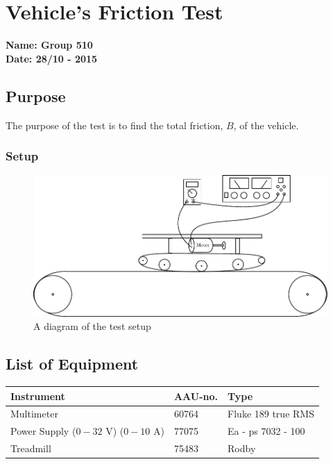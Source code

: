 \pagebreak
\section{Vehicle's Friction Test} \label{app:frictionTest}
\textbf{Name: Group 510}\\
\textbf{Date: 28/10 - 2015}

\subsection{Purpose}
The purpose of the test is to find the total friction, $B$, of the vehicle.
\subsubsection{Setup}
\begin{figure}[H]
  \centering
	\includegraphics[scale=1]{figures/frictionTestSetup.pdf}
	\caption{A diagram of the test setup}
\end{figure}

\subsection{List of Equipment}

\begin{table}[H]
\begin{tabular}{|l|l|p{4cm}|}
\hline%
  \textbf{Instrument}                       &  \textbf{AAU-no.}  &  \textbf{Type}         \\
\hline%
  Multimeter                                &  60764             &  Fluke 189 true RMS    \\
\hline%
  Power Supply ($0 - 32$ V) ($0 - 10$ A)    &  77075             &  Ea - ps 7032 - 100    \\
\hline%
  Treadmill                                 &  75483             &  Rodby                 \\
\hline%
\end{tabular}
\end{table}

